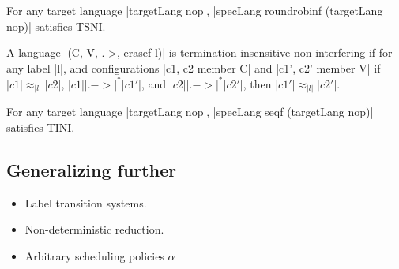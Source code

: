 \begin{theorem}
For any target language |targetLang nop|, |specLang roundrobinf
(targetLang nop)| satisfies TSNI.
\end{theorem}

\begin{definition}
  A language |(C, V, .->, erasef l)| is termination
  insensitive non-interfering if for any label |l|, and configurations
  |c1, c2 member C| and |c1', c2' member V| if
   $|c1| \approx_{|l|} |c2|$,
   $|c1| |.->|^* |c1'|$, and
   $|c2| |.->|^* |c2'|$, then
   $|c1'| \approx_{|l|} |c2'|$.
\end{definition}


\begin{theorem}
For any target language |targetLang nop|, |specLang seqf (targetLang
nop)| satisfies TINI.
\end{theorem}





\subsection{Generalizing further}

\begin{itemize}
\item Label transition systems.
\item Non-deterministic reduction.
\item Arbitrary scheduling policies $\alpha$
\end{itemize}








